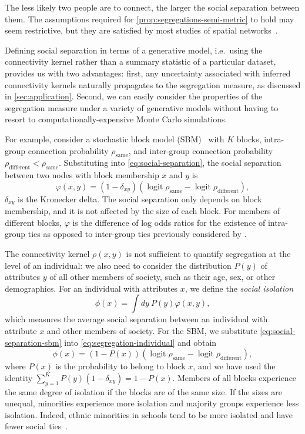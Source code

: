 \documentclass{scrartcl}
\DeclareMathOperator{\logit}{logit}
\begin{document}
The less likely two people are to connect, the larger the social separation between them. The assumptions required for \cref{prop:segregations-semi-metric} to hold may seem restrictive, but they are satisfied by most studies of spatial networks~\cite{Barnett2007,Lambiotte2008,Butts2012,Expert2011}.

Defining social separation in terms of a generative model, i.e.\ using the connectivity kernel rather than a summary statistic of a particular dataset, provides us with two advantages: first, any uncertainty associated with inferred connectivity kernels naturally propagates to the segregation measure, as discussed in \cref{sec:application}. Second, we can easily consider the properties of the segregation measure under a variety of generative models without having to resort to computationally-expensive Monte Carlo simulations.

For example, consider a stochastic block model (SBM)~\cite{Snijders2011} with $K$ blocks, intra-group connection probability $\rho_\mathrm{same}$, and inter-group connection probability $\rho_\mathrm{different}<\rho_\mathrm{same}$. Substituting into \cref{eq:social-separation}, the social separation between two nodes with block membership $x$ and $y$ is
\begin{equation}
    \varphi(x, y) = \left(1-\delta_{xy}\right)\left(\logit\rho_\mathrm{same}-\logit\rho_\mathrm{different}\right),\label{eq:social-separation-sbm}
\end{equation}
$\delta_{xy}$ is the Kronecker delta. The social separation only depends on block membership, and it is not affected by the size of each block. For members of different blocks, $\varphi$ is the difference of log odds ratios for the existence of intra-group ties as opposed to inter-group ties previously considered by \textcite{Moody2001}.

The connectivity kernel $\rho(x, y)$ is not sufficient to quantify segregation at the level of an individual: we also need to consider the distribution $P(y)$ of attributes $y$ of all other members of society, such as their age, sex, or other demographics. For an individual with attributes $x$, we define the \emph{social isolation}
\begin{equation}
    \phi(x) = \int dy \ P(y) \varphi(x, y),\label{eq:segregation-individual}
\end{equation}
which measures the average social separation between an individual with attribute $x$ and other members of society. For the SBM, we substitute \cref{eq:social-separation-sbm} into \cref{eq:segregation-individual} and obtain
\begin{equation}
    \phi(x) = (1-P(x))\left(\logit\rho_\mathrm{same}-\logit\rho_\mathrm{different}\right),\label{eq:segregation-individual-sbm}
\end{equation}
where $P(x)$ is the probability to belong to block $x$, and we have used the identity $\sum_{y=1}^K P(y)\left(1-\delta_{xy}\right)= 1 - P(x)$. Members of all blocks experience the same degree of isolation if the blocks are of the same size. If the sizes are unequal, minorities experience more isolation and majority groups experience less isolation. Indeed, ethnic minorities in schools tend to be more isolated and have fewer social ties~\cite{Currarini2009}.
\end{document}
